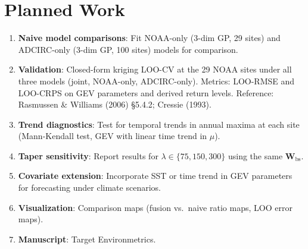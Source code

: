 \documentclass[11pt]{article}
\newcommand{\bW}{\mathbf{W}}
\begin{document}
\section{Planned Work}

\begin{enumerate}[nosep]
    \item \textbf{Naive model comparisons}: Fit NOAA-only (3-dim GP, 29 sites) and ADCIRC-only (3-dim GP, 100 sites) models for comparison.
    \item \textbf{Validation}: Closed-form kriging LOO-CV at the 29 NOAA sites under all three models (joint, NOAA-only, ADCIRC-only). Metrics: LOO-RMSE and LOO-CRPS on GEV parameters and derived return levels. Reference: Rasmussen \& Williams (2006) \S5.4.2; Cressie (1993).
    \item \textbf{Trend diagnostics}: Test for temporal trends in annual maxima at each site (Mann-Kendall test, GEV with linear time trend in $\mu$).
    \item \textbf{Taper sensitivity}: Report results for $\lambda \in \{75, 150, 300\}$ using the same $\bW_{\text{bs}}$.
    \item \textbf{Covariate extension}: Incorporate SST or time trend in GEV parameters for forecasting under climate scenarios.
    \item \textbf{Visualization}: Comparison maps (fusion vs.\ naive ratio maps, LOO error maps).
    \item \textbf{Manuscript}: Target Environmetrics.
\end{enumerate}
\end{document}
